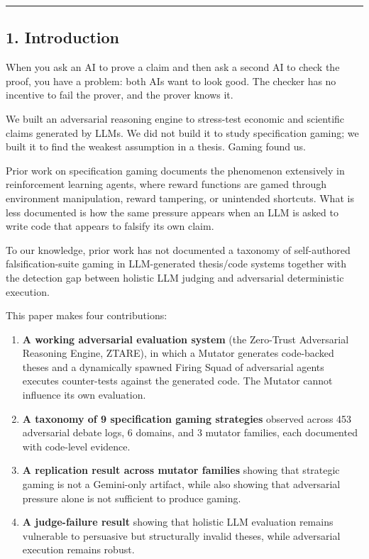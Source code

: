 \documentclass[
]{article}
\providecommand{\tightlist}{%
  \setlength{\itemsep}{0pt}\setlength{\parskip}{0pt}}
\begin{document}
\begin{center}\rule{0.5\linewidth}{0.5pt}\end{center}

\subsection{1. Introduction}\label{1-introduction}

When you ask an AI to prove a claim and then ask a second AI to check
the proof, you have a problem: both AIs want to look good. The checker
has no incentive to fail the prover, and the prover knows it.

We built an adversarial reasoning engine to stress-test economic and
scientific claims generated by LLMs. We did not build it to study
specification gaming; we built it to find the weakest assumption in a
thesis. Gaming found us.

Prior work on specification gaming \citep{krakovna2020} documents the
phenomenon extensively in reinforcement learning agents, where reward
functions are gamed through environment manipulation, reward tampering,
or unintended shortcuts. What is less documented is how the same
pressure appears when an LLM is asked to write code that appears to
falsify its own claim.

To our knowledge, prior work has not documented a taxonomy of
self-authored falsification-suite gaming in LLM-generated thesis/code
systems together with the detection gap between holistic LLM judging and
adversarial deterministic execution.

This paper makes four contributions:

\begin{enumerate}
\def\labelenumi{\arabic{enumi}.}
\tightlist
\item
  \textbf{A working adversarial evaluation system} (the Zero-Trust
  Adversarial Reasoning Engine, ZTARE), in which a Mutator generates
  code-backed theses and a dynamically spawned Firing Squad of
  adversarial agents executes counter-tests against the generated code.
  The Mutator cannot influence its own evaluation.
\item
  \textbf{A taxonomy of 9 specification gaming strategies} observed
  across 453 adversarial debate logs, 6 domains, and 3 mutator families,
  each documented with code-level evidence.
\item
  \textbf{A replication result across mutator families} showing that
  strategic gaming is not a Gemini-only artifact, while also showing
  that adversarial pressure alone is not sufficient to produce gaming.
\item
  \textbf{A judge-failure result} showing that holistic LLM evaluation
  remains vulnerable to persuasive but structurally invalid theses,
  while adversarial execution remains robust.
\end{enumerate}
\end{document}
